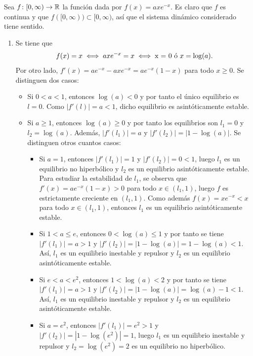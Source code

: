 \documentclass[11pt]{report}
\begin{document}
\begin{solution}
    Sea $f \colon [0,\infty)\to\mathbb R$ la función dada por $f(x) = axe^{-x}$. Es claro que $f$ es continua y que $f([0,\infty)) \subset [0,\infty)$, así que el sistema dinámico considerado tiene sentido.
    \begin{enumerate}
        \item Se tiene que
        \[f(x) = x \iff axe^{-x} = x \iff \textup{x = 0} \textup{ ó } x = \log(a).\]
        Por otro lado, $f'(x) = ae^{-x}-axe^{-x} = ae^{-x}(1-x)$ para todo $x \geq 0$. Se distinguen dos casos:
        \begin{itemize}
            \item Si $ 0 < a < 1$, entonces $\log(a) < 0$ y por tanto el único equilibrio es $l = 0$. Como $|f'(l)| = a < 1$, dicho equilibrio es asintóticamente estable.
            \item Si $a \geq 1$, entonces $\log(a) \geq 0$ y por tanto los equilibrios son $l_1 = 0$ y $l_2 = \log(a)$. Además, $|f'(l_1)| = a$ y $|f'(l_2)| = |1-\log(a)|$. Se distinguen otros cuantos casos:
            \begin{itemize}
                \item Si $a = 1$, entonces $|f'(l_1)| = 1$ y $|f'(l_2)| = 0 <1 $, luego $l_1$ es un equilibrio no hiperbólico y $l_2$ es un equilibrio asintóticamente estable. Para estudiar la estabilidad de $l_1$, se observa que $f'(x) = ae^{-x}(1-x) > 0$ para todo $x \in (l_1,1)$, luego $f$ es estrictamente creciente en $(l_1,1)$. Como además $f(x) = xe^{-x} < x$ para todo $x \in (l_1,1)$, entonces $l_1$ es un equilibrio asintóticamente estable.
                \item Si $1 < a \leq e$, entonces $0 <\log(a) \leq 1$ y por tanto se tiene $|f'(l_1)| = a > 1$ y $|f'(l_2)| = |1-\log(a)| = 1-\log(a) < 1$. Así, $l_1$ es un equilibrio inestable y repulsor y $l_2$ es un equilibrio asintóticamente estable.
                \item Si $e < a < e^2$, entonces $1 <\log(a) < 2$ y por tanto se tiene $|f'(l_1)| = a > 1$ y $|f'(l_2)| = |1-\log(a)| = \log(a)-1 < 1$. Así, $l_1$ es un equilibrio inestable y repulsor y $l_2$ es un equilibrio asintóticamente estable.
                \item Si $a = e^2$, entonces $|f'(l_1)| = e^2 > 1$ y $|f'(l_2)| = |1-\log(e^2)| = 1$, luego $l_1$ es un equilibrio inestable y repulsor y $l_2 = \log(e^2) = 2$ es un equilibrio no hiperbólico.
                \begin{figure}[H]
                    \centering

\end{figure}
\end{itemize}
\end{itemize}
\end{enumerate}
\end{solution}
\end{document}
